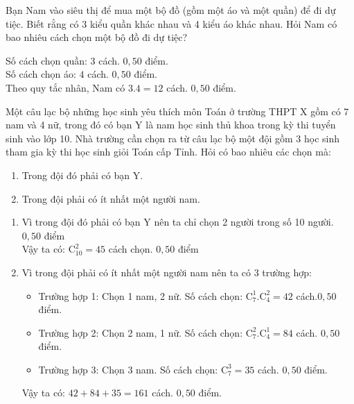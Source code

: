 \begin{bt}[1,5 điểm]%
	Bạn Nam vào siêu thị để mua một bộ đồ (gồm một áo và một quần) để đi dự tiệc. Biết rằng có 3 kiểu quần khác nhau và 4 kiểu áo khác nhau. Hỏi Nam có bao nhiêu cách chọn một bộ đồ đi dự tiệc?
	\loigiai
	{Số cách chọn quần: $3$ cách. \dotfill $0,50$ điểm.\\
		Số cách chọn áo: $4$ cách. \dotfill $0,50$ điểm.\\
		Theo quy tắc nhân, Nam có  $3.4=12$ cách. \dotfill $0,50$ điểm.
		
	}
\end{bt}
\begin{bt}[3,0 điểm]%
	Một câu lạc bộ những học sinh yêu thích môn Toán ở trường THPT X  gồm có 7 nam và 4 nữ, trong đó có bạn Y là nam học sinh thủ khoa trong kỳ thi tuyển sinh vào lớp 10. Nhà trường cần chọn ra từ câu lạc bộ một đội gồm 3 học sinh tham gia kỳ thi học sinh giỏi Toán cấp Tỉnh. Hỏi có bao nhiêu các chọn mà:
	\begin{enumerate}
		\item Trong đội đó phải có bạn Y.
		\item Trong đội phải có ít nhất một người nam.
	\end{enumerate}
	\loigiai
	{
		\begin{enumerate}
			\item  Vì trong đội đó phải có bạn Y nên ta chỉ chọn 2 người trong số 10 người. \dotfill $0,50$ điểm\\
			Vậy ta có: $\mathrm{C}^2_{10}=45$ cách chọn. \dotfill $0,50$ điểm
			\item Vì trong đội phải có ít nhất một người nam nên ta có $3$ trường hợp:
			\begin{itemize}
				\item Trường hợp 1: Chọn 1 nam, 2 nữ. Số cách chọn: $\mathrm{C}^1_7.\mathrm{C}^2_4=42$ cách.\dotfill $0,50$ điểm.
				\item Trường hợp 2: Chọn 2 nam, 1 nữ. Số cách chọn: $\mathrm{C}^2_7.\mathrm{C}^1_4=84$ cách. \dotfill $0,50$ điểm.
				\item Trường hợp 3: Chọn 3 nam. Số cách chọn: $\mathrm{C}^3_7=35$ cách. \dotfill $0,50$ điểm.
			\end{itemize}
			Vậy ta có: $42 + 84 + 35 = 161$ cách. \dotfill $0,50$ điểm.
		\end{enumerate}
		
	}
\end{bt}
